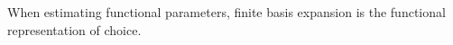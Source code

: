 \begin{note}
When estimating functional parameters, finite basis expansion is
the functional representation of choice.
\end{note}


